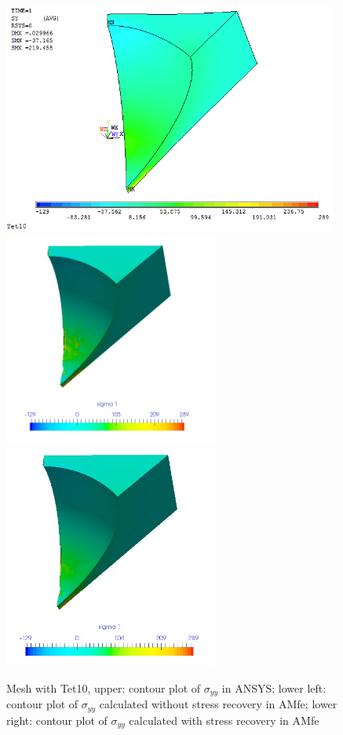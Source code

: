 \begin{figure}[htbp]
	\begin{center}
		\includegraphics[width=11cm,clip]{Tet10_Syy.png} 	
		\includegraphics[width=7cm,clip]{Tet10_Syy_PD.png} 			
		\includegraphics[width=7cm,clip]{Tet10_Syy_P.png} 		
		\caption{Mesh with Tet10, upper: contour plot of $\sigma_{yy}$ in ANSYS; lower left: contour plot of $\sigma_{yy}$ calculated without stress recovery in AMfe; lower right: contour plot of $\sigma_{yy}$ calculated with stress recovery in AMfe} \label{fig: Tet10_Syy}
	\end{center}
\end{figure}
\clearpage 

